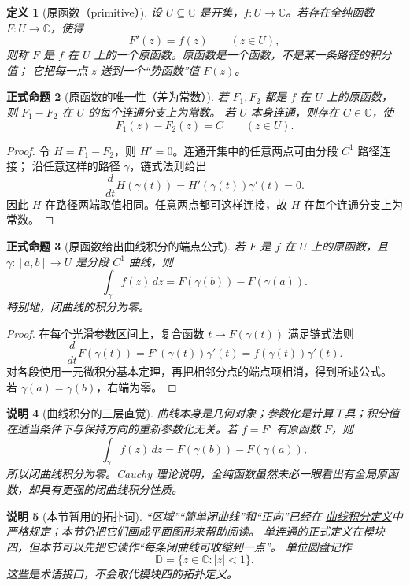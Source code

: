 \documentclass[UTF8,fontset=none,a4paper,11pt]{ctexart}
\theoremstyle{foundation-definition}
\newtheorem{definition}{定义}[section]
\theoremstyle{foundation-theorem}
\theoremstyle{foundation-proposition}
\newtheorem{proposition}[definition]{正式命题}
\theoremstyle{foundation-example}
\theoremstyle{foundation-remark}
\newtheorem{remark}[definition]{说明}
\theoremstyle{foundation-theorem}
\newcommand{\term}[2]{\hyperref[#1]{#2}}
\begin{document}
\begin{definition}[原函数（primitive）]\label{def:primitive-complex}
设 \(U\subseteq\mathbb C\) 是开集，\(f:U\to\mathbb C\)。若存在全纯函数
\(F:U\to\mathbb C\)，使得
\[
 F'(z)=f(z)\qquad(z\in U),
\]
则称 \(F\) 是 \(f\) 在 \(U\) 上的一个原函数。原函数是一个函数，不是某一条路径的积分值；
它把每一点 \(z\) 送到一个“势函数”值 \(F(z)\)。
\end{definition}

\begin{proposition}[原函数的唯一性（差为常数）]\label{prop:primitive-uniqueness}
若 \(F_1,F_2\) 都是 \(f\) 在 \(U\) 上的原函数，则 \(F_1-F_2\) 在 \(U\) 的每个连通分支上为常数。
若 \(U\) 本身连通，则存在 \(C\in\mathbb C\)，使
\[
F_1(z)-F_2(z)=C\qquad(z\in U).
\]
\end{proposition}

\begin{proof}
令 \(H=F_1-F_2\)，则 \(H'=0\)。连通开集中的任意两点可由分段 \(C^1\) 路径连接；
沿任意这样的路径 \(\gamma\)，链式法则给出
\[
\frac{d}{dt}H(\gamma(t))=H'(\gamma(t))\gamma'(t)=0.
\]
因此 \(H\) 在路径两端取值相同。任意两点都可这样连接，故 \(H\) 在每个连通分支上为常数。
\end{proof}

\begin{proposition}[原函数给出曲线积分的端点公式]\label{prop:primitive-path-integral}
若 \(F\) 是 \(f\) 在 \(U\) 上的原函数，且 \(\gamma:[a,b]\to U\) 是分段 \(C^1\) 曲线，则
\[
 \int_\gamma f(z)\,dz
 =F(\gamma(b))-F(\gamma(a)).
\]
特别地，闭曲线的积分为零。
\end{proposition}

\begin{proof}
在每个光滑参数区间上，复合函数 \(t\mapsto F(\gamma(t))\) 满足链式法则
\[
 \frac{d}{dt}F(\gamma(t))=F'(\gamma(t))\gamma'(t)
 =f(\gamma(t))\gamma'(t).
\]
对各段使用一元微积分基本定理，再把相邻分点的端点项相消，得到所述公式。
若 \(\gamma(a)=\gamma(b)\)，右端为零。
\end{proof}

\begin{remark}[曲线积分的三层直觉]
曲线本身是几何对象；参数化是计算工具；积分值在适当条件下与保持方向的重新参数化无关。若 \(f=F'\) 有原函数 \(F\)，则
\[
\int_\gamma f(z)\,dz=F(\gamma(b))-F(\gamma(a)),
\]
所以闭曲线积分为零。Cauchy 理论说明，全纯函数虽然未必一眼看出有全局原函数，却具有更强的闭曲线积分性质。
\end{remark}

\begin{remark}[本节暂用的拓扑词]\label{rem:complex-topology-preview}
“区域”“简单闭曲线”和“正向”已经在
\term{def:complex-line-integral}{曲线积分定义}中严格规定；本节仍把它们画成平面图形来帮助阅读。
单连通的正式定义在模块四，但本节可以先把它读作“每条闭曲线可收缩到一点”。
单位圆盘记作
\[
\mathbb D=\{z\in\mathbb C:|z|<1\}.
\]
这些是术语接口，不会取代模块四的拓扑定义。
\end{remark}
\end{document}
